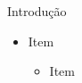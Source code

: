 \begin{frame}[t]{Introdução}
	\begin{itemize}
		\item Item
		\begin{itemize}
			\item Item
		\end{itemize}
	\end{itemize}
\end{frame}